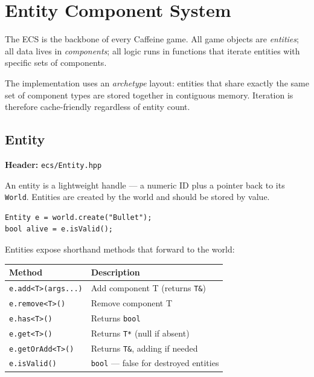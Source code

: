 \chapter{Entity Component System}

The ECS is the backbone of every Caffeine game. All game objects are
\emph{entities}; all data lives in \emph{components}; all logic runs in
functions that iterate entities with specific sets of components.

The implementation uses an \emph{archetype} layout: entities that share
exactly the same set of component types are stored together in contiguous
memory. Iteration is therefore cache-friendly regardless of entity count.

\section{Entity}

\textbf{Header:} \texttt{ecs/Entity.hpp}

An entity is a lightweight handle — a numeric ID plus a pointer back to its
\texttt{World}. Entities are created by the world and should be stored by
value.

\begin{lstlisting}
Entity e = world.create("Bullet");
bool alive = e.isValid();
\end{lstlisting}

Entities expose shorthand methods that forward to the world:

\begin{longtable}{ll}
\toprule
\textbf{Method} & \textbf{Description} \\
\midrule
\texttt{e.add<T>(args...)}  & Add component T (returns \texttt{T\&}) \\
\texttt{e.remove<T>()}      & Remove component T \\
\texttt{e.has<T>()}         & Returns \texttt{bool} \\
\texttt{e.get<T>()}         & Returns \texttt{T*} (null if absent) \\
\texttt{e.getOrAdd<T>()}    & Returns \texttt{T\&}, adding if needed \\
\texttt{e.isValid()}        & \texttt{bool} — false for destroyed entities \\
\bottomrule
\end{longtable}


